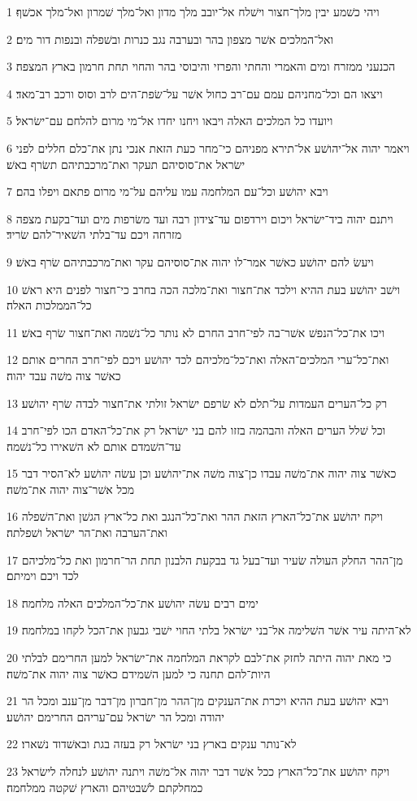 \par 1 ויהי כשׁמע יבין מלך־חצור וישׁלח אל־יובב מלך מדון ואל־מלך שׁמרון ואל־מלך אכשׁף׃
\par 2 ואל־המלכים אשׁר מצפון בהר ובערבה נגב כנרות ובשׁפלה ובנפות דור מים׃
\par 3 הכנעני ממזרח ומים והאמרי והחתי והפרזי והיבוסי בהר והחוי תחת חרמון בארץ המצפה׃
\par 4 ויצאו הם וכל־מחניהם עמם עם־רב כחול אשׁר על־שׂפת־הים לרב וסוס ורכב רב־מאד׃
\par 5 ויועדו כל המלכים האלה ויבאו ויחנו יחדו אל־מי מרום להלחם עם־ישׂראל׃
\par 6 ויאמר יהוה אל־יהושׁע אל־תירא מפניהם כי־מחר כעת הזאת אנכי נתן את־כלם חללים לפני ישׂראל את־סוסיהם תעקר ואת־מרכבתיהם תשׂרף באשׁ׃
\par 7 ויבא יהושׁע וכל־עם המלחמה עמו עליהם על־מי מרום פתאם ויפלו בהם׃
\par 8 ויתנם יהוה ביד־ישׂראל ויכום וירדפום עד־צידון רבה ועד משׂרפות מים ועד־בקעת מצפה מזרחה ויכם עד־בלתי השׁאיר־להם שׂריד׃
\par 9 ויעשׂ להם יהושׁע כאשׁר אמר־לו יהוה את־סוסיהם עקר ואת־מרכבתיהם שׂרף באשׁ׃
\par 10 וישׁב יהושׁע בעת ההיא וילכד את־חצור ואת־מלכה הכה בחרב כי־חצור לפנים היא ראשׁ כל־הממלכות האלה׃
\par 11 ויכו את־כל־הנפשׁ אשׁר־בה לפי־חרב החרם לא נותר כל־נשׁמה ואת־חצור שׂרף באשׁ׃
\par 12 ואת־כל־ערי המלכים־האלה ואת־כל־מלכיהם לכד יהושׁע ויכם לפי־חרב החרים אותם כאשׁר צוה משׁה עבד יהוה׃
\par 13 רק כל־הערים העמדות על־תלם לא שׂרפם ישׂראל זולתי את־חצור לבדה שׂרף יהושׁע׃
\par 14 וכל שׁלל הערים האלה והבהמה בזזו להם בני ישׂראל רק את־כל־האדם הכו לפי־חרב עד־השׁמדם אותם לא השׁאירו כל־נשׁמה׃
\par 15 כאשׁר צוה יהוה את־משׁה עבדו כן־צוה משׁה את־יהושׁע וכן עשׂה יהושׁע לא־הסיר דבר מכל אשׁר־צוה יהוה את־משׁה׃
\par 16 ויקח יהושׁע את־כל־הארץ הזאת ההר ואת־כל־הנגב ואת כל־ארץ הגשׁן ואת־השׁפלה ואת־הערבה ואת־הר ישׂראל ושׁפלתה׃
\par 17 מן־ההר החלק העולה שׂעיר ועד־בעל גד בבקעת הלבנון תחת הר־חרמון ואת כל־מלכיהם לכד ויכם וימיתם׃
\par 18 ימים רבים עשׂה יהושׁע את־כל־המלכים האלה מלחמה׃
\par 19 לא־היתה עיר אשׁר השׁלימה אל־בני ישׂראל בלתי החוי ישׁבי גבעון את־הכל לקחו במלחמה׃
\par 20 כי מאת יהוה היתה לחזק את־לבם לקראת המלחמה את־ישׂראל למען החרימם לבלתי היות־להם תחנה כי למען השׁמידם כאשׁר צוה יהוה את־משׁה׃
\par 21 ויבא יהושׁע בעת ההיא ויכרת את־הענקים מן־ההר מן־חברון מן־דבר מן־ענב ומכל הר יהודה ומכל הר ישׂראל עם־עריהם החרימם יהושׁע׃
\par 22 לא־נותר ענקים בארץ בני ישׂראל רק בעזה בגת ובאשׁדוד נשׁארו׃
\par 23 ויקח יהושׁע את־כל־הארץ ככל אשׁר דבר יהוה אל־משׁה ויתנה יהושׁע לנחלה לישׂראל כמחלקתם לשׁבטיהם והארץ שׁקטה ממלחמה׃

